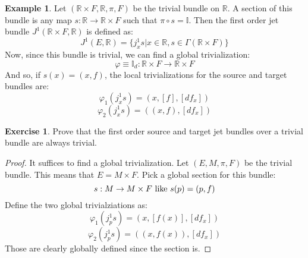 \documentclass[12pt,a4paper]{report}
\theoremstyle{definition}
\theoremstyle{Theorem}
\theoremstyle{definition}
\newtheorem{Ex}[Def]{Example}
\newtheorem{Exe}[Def]{Exercise}
\theoremstyle{definition}
\begin{document}
	\begin{Ex}
		Let $(\mathbb{R}\times F,\mathbb{R},\pi,F)$ be the trivial bundle on $\mathbb{R}$. A section of this bundle is any map $s:\mathbb{R}\rightarrow \mathbb{R}\times F$ such that $\pi\circ s=\mathbb{I}$.
		Then the first order jet bundle $J^1(\mathbb{R}\times F,\mathbb{R})$ is defined as:
		$$J^1(E,\mathbb{R})=\{j^1_xs\big|x\in\mathbb{R},s\in\Gamma(\mathbb{R}\times F)\}$$
		Now, since this bundle is trivial, we can find a global trivialization:
		$$\varphi\equiv \mathbb{I}_d:\mathbb{R}\times F\rightarrow \mathbb{R}\times F$$
		And so, if $s(x)=(x,f)$, the local trivializations for the source and target bundles are:
		$$\varphi_1(j^1_xs)=(x,[f],[df_x])$$
		$$\varphi_2(j^1_xs)=((x,f),[df_x])$$
	\end{Ex}
	\begin{Exe}
		Prove that the first order source and target jet bundles over a trivial bundle are always trivial.
	\end{Exe}
	\begin{proof}
		It suffices to find a global trivialization. Let $(E,M,\pi,F)$ be the trivial bundle. This means that $E=M\times F$. Pick a global section for this bundle:
		$$s:M\rightarrow M\times F\hbox{ like }s(p)=(p,f)$$
		Define the two global trivialziations as:
		$$\varphi_1(j^1_ps)=(x,[f(x)],[df_x])$$
		$$\varphi_2(j^1_ps)=((x,f(x)),[df_x])$$
		Those are clearly globally defined since the section is.
	\end{proof}
\end{document}
